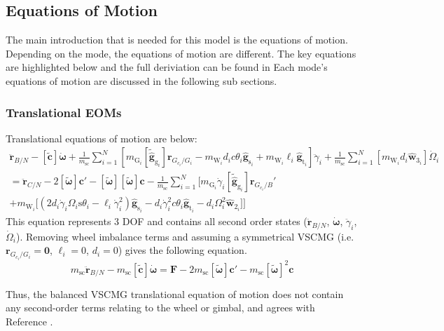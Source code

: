 \subsection{Equations of Motion}

The main introduction that is needed for this model is the equations of motion. Depending on the mode, the equations of motion are different. The key equations are highlighted below and the full deriviation can be found in Each mode's equations of motion are discussed in the following sub sections.

\subsubsection{Translational EOMs}
Translational equations of motion are below:
\begin{multline}
\ddot{\bm r}_{B/N} - [\tilde{\bm{c}}]\dot{\bm \omega} 
+ \frac{1}{m_{\text{sc}}} \sum\limits_{i=1}^{N} \left[ m_{\text{G}_i} \left[\tilde{\hat{\bm g}}_{\text{g}_i} \right] \bm{r}_{G_{c_i}/G_i} - m_{\text{W}_i}d_ic\theta_i\hat{\bm{g}}_{\text{s}_i} + m_{\text{W}_i}\ell_i\hat{\bm{g}}_{\text{t}_i} \right] \ddot{\gamma}_i
+ \frac{1}{m_{\text{sc}}} \sum\limits_{i=1}^{N} \left[ m_{\text{W}_i}d_i\hat{\bm w}_{3_i} \right] \dot{\Omega}_i
\\= \ddot{\bm r}_{C/N} - 2[\tilde{\bm{\omega}}]\bm{c}' - [\tilde{\bm{\omega}}][\tilde{\bm{\omega}}]\bm{c} 
- \frac{1}{m_{\text{sc}}} \sum\limits_{i=1}^{N} \Big[ 
m_{\text{G}_i}\dot{\gamma}_i[\tilde{\hat{\bm g}}_{\text{g}_i}] \bm{r}_{G_{c_i}/B}'
\\+ m_{\text{W}_i} \big[ \left(2d_i\dot{\gamma}_i\Omega_i\text{s}\theta_i - \ell_i\dot{\gamma}_i^2 \right)\hat{\bm{g}}_{\text{s}_i} - d_i\dot{\gamma}_i^2c\theta_i\hat{\bm{g}}_{\text{t}_i} - d_i\Omega_i^2 \hat{\bm{w}}_{2_i} \big] \Big]
\end{multline}
This equation represents 3 DOF and contains all second order states ($\ddot{\bm r}_{B/N}$, $\dot{\bm \omega}$, $\ddot{\gamma}_i$, $\dot{\Omega}_i$). Removing wheel imbalance terms and assuming a symmetrical VSCMG (i.e. $\bm{r}_{G_{c_i}/G_i} = \bm{0}$, $\ell_i = 0$, $d_i = 0$) gives the following equation.
\begin{equation}
	m_\text{sc}\ddot{\bm r}_{B/N} - m_\text{sc}[\tilde{\bm{c}}]\dot{\bm \omega} 
	= \bm{F} - 2m_\text{sc}[\tilde{\bm{\omega}}]\bm{c}' - m_\text{sc}[\tilde{\bm{\omega}}]^2\bm{c} 
	\label{eq:vscmgTranslationSimple}
\end{equation}

Thus, the balanced VSCMG translational equation of motion does not contain any second-order terms relating to the wheel or gimbal, and agrees with Reference \cite{schaub}. 

